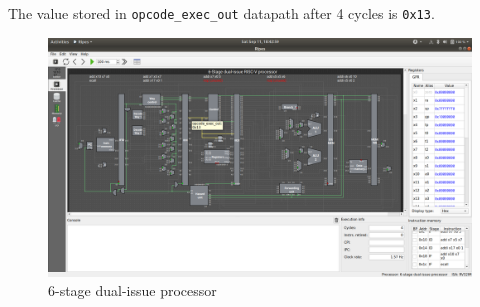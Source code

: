\documentclass[12pt, fleqn]{article}
\begin{document}
\subsection{}
The value stored in \verb!opcode_exec_out! datapath after 4 cycles is \verb!0x13!.
\begin{figure}[H]
  \centering
  \includegraphics[scale=0.22]{Q3/6di_datapath.png}
  \caption{6-stage dual-issue processor}
\end{figure}
\end{document}
